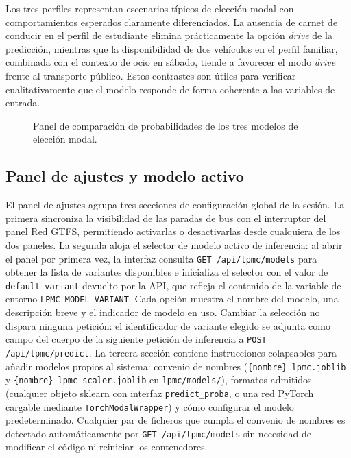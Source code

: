 Los tres perfiles representan escenarios típicos de elección modal con comportamientos esperados claramente diferenciados. La ausencia de carnet de conducir en el perfil de estudiante elimina prácticamente la opción \textit{drive} de la predicción, mientras que la disponibilidad de dos vehículos en el perfil familiar, combinada con el contexto de ocio en sábado, tiende a favorecer el modo \textit{drive} frente al transporte público. Estos contrastes son útiles para verificar cualitativamente que el modelo responde de forma coherente a las variables de entrada.

\begin{figure}[htbp]
  \centering
  \caption{Panel de comparación de probabilidades de los tres modelos de elección modal.}
  \label{fig:panel_comparacion}
\end{figure}

\subsection{Panel de ajustes y modelo activo}
\label{subsec:impl_frontend_ajustes}

El panel de ajustes agrupa tres secciones de configuración global de la sesión. La primera sincroniza la visibilidad de las paradas de bus con el interruptor del panel Red GTFS, permitiendo activarlas o desactivarlas desde cualquiera de los dos paneles. La segunda aloja el selector de modelo activo de inferencia: al abrir el panel por primera vez, la interfaz consulta \texttt{GET /api/lpmc/models} para obtener la lista de variantes disponibles e inicializa el selector con el valor de \texttt{default\_variant} devuelto por la API, que refleja el contenido de la variable de entorno \texttt{LPMC\_MODEL\_VARIANT}. Cada opción muestra el nombre del modelo, una descripción breve y el indicador de modelo en uso. Cambiar la selección no dispara ninguna petición: el identificador de variante elegido se adjunta como campo del cuerpo de la siguiente petición de inferencia a \texttt{POST /api/lpmc/predict}. La tercera sección contiene instrucciones colapsables para añadir modelos propios al sistema: convenio de nombres (\texttt{\{nombre\}\_lpmc.joblib} y \texttt{\{nombre\}\_lpmc\_scaler.joblib} en \texttt{lpmc/models/}), formatos admitidos (cualquier objeto sklearn con interfaz \texttt{predict\_proba}, o una red PyTorch cargable mediante \texttt{TorchModalWrapper}) y cómo configurar el modelo predeterminado. Cualquier par de ficheros que cumpla el convenio de nombres es detectado automáticamente por \texttt{GET /api/lpmc/models} sin necesidad de modificar el código ni reiniciar los contenedores.

